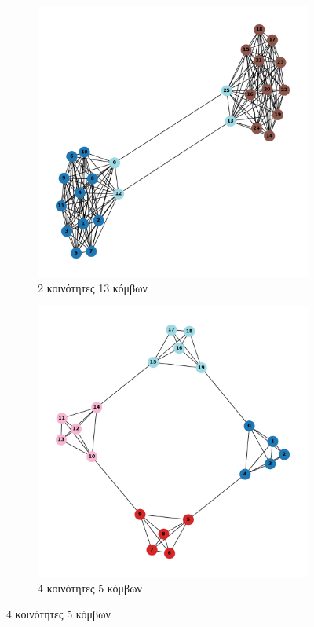 \documentclass[12pt, letterpaper]{article}
\begin{document}
\begin{figure}
  \begin{subfigure}{0.5\textwidth}
    \centering
    \includegraphics[width=0.6\linewidth]{AUTO2,13.pdf}
    \caption{2 κοινότητες 13 κόμβων}
    \label{}
  \end{subfigure}
  \begin{subfigure}{0.5\textwidth}
    \centering
    \includegraphics[width=0.6\linewidth]{AUTO4,5.pdf}
    \caption{4 κοινότητες 5 κόμβων}
    \label{}
  \end{subfigure}

  \vfill


\end{figure}
\end{document}
